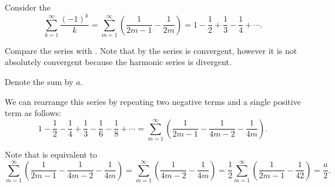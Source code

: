 \begin{example}\label{ex:riemanns_series_permutation_theorem/alternating_harmonic_series}\cite[]{Фихтенгольц1968/2}
  Consider the 
  \begin{equation}\label{ex:riemanns_series_permutation_theorem/alternating_harmonic_series/series}
    \sum_{k=1}^\infty \frac {(-1)^k} k
    =
    \sum_{m=1}^\infty \left( \frac 1 {2m - 1} - \frac 1 {2m} \right)
    =
    1 - \frac 1 2 + \frac 1 3 - \frac 1 4 + \cdots.
  \end{equation}

  Compare the series with . Note that by  the series is convergent, however it is not absolutely convergent because the harmonic series  is divergent.

  Denote the sum by \( a \).

  We can rearrange this series by repeating two negative terms and a single positive term as follows:
  \begin{equation}\label{ex:riemanns_series_permutation_theorem/alternating_harmonic_series/rearranged}
    1 - \frac 1 2 - \frac 1 4 + \frac 1 3 - \frac 1 6 - \frac 1 8 + \cdots
    =
    \sum_{m=1}^\infty \left( \frac 1 {2m - 1} - \frac 1 {4m - 2} - \frac 1 {4m} \right).
  \end{equation}

  Note that  is equivalent to
  \begin{equation*}
    \sum_{m=1}^\infty \left( \frac 1 {2m - 1} - \frac 1 {4m - 2} - \frac 1 {4m} \right)
    =
    \sum_{m=1}^\infty \left( \frac 1 {4m - 2} - \frac 1 {4m} \right)
    =
    \frac 1 2 \sum_{m=1}^\infty \left( \frac 1 {2m - 1} - \frac 1 {42} \right)
    =
    \frac a 2.
  \end{equation*}
\end{example}

